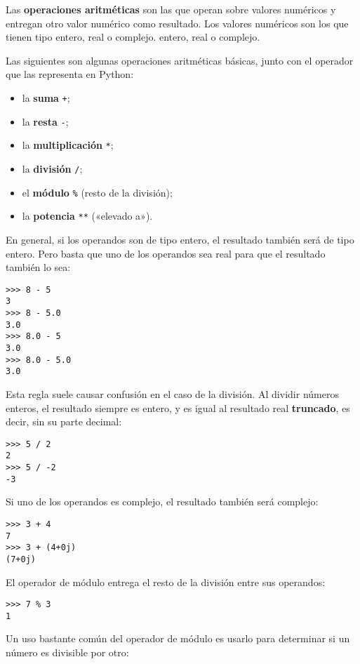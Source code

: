 Las \textbf{operaciones aritméticas} son las que operan sobre valores
numéricos y entregan otro valor numérico como resultado. Los valores
numéricos son los que tienen tipo entero, real o complejo. entero, real
o complejo.

Las siguientes son algunas operaciones aritméticas básicas, junto con el
operador que las representa en Python:

\begin{itemize}
\item
  la \textbf{suma} \lstinline!+!;
\item
  la \textbf{resta} \lstinline!-!;
\item
  la \textbf{multiplicación} \lstinline!*!;
\item
  la \textbf{división} \lstinline!/!;
\item
  el \textbf{módulo} \lstinline!%! (resto de la división);
\item
  la \textbf{potencia} \lstinline!**! («elevado a»).
\end{itemize}

En general, si los operandos son de tipo entero, el resultado también
será de tipo entero. Pero basta que uno de los operandos sea real para
que el resultado también lo sea:

\begin{lstlisting}
>>> 8 - 5
3
>>> 8 - 5.0
3.0
>>> 8.0 - 5
3.0
>>> 8.0 - 5.0
3.0
\end{lstlisting}

Esta regla suele causar confusión en el caso de la división. Al dividir
números enteros, el resultado siempre es entero, y es igual al resultado
real \textbf{truncado}, es decir, sin su parte decimal:

\begin{lstlisting}
>>> 5 / 2
2
>>> 5 / -2
-3
\end{lstlisting}

Si uno de los operandos es complejo, el resultado también será complejo:

\begin{lstlisting}
>>> 3 + 4
7
>>> 3 + (4+0j)
(7+0j)
\end{lstlisting}

El operador de módulo entrega el resto de la división entre sus
operandos:

\begin{lstlisting}
>>> 7 % 3
1
\end{lstlisting}

Un uso bastante común del operador de módulo es usarlo para determinar
si un número es divisible por otro:

